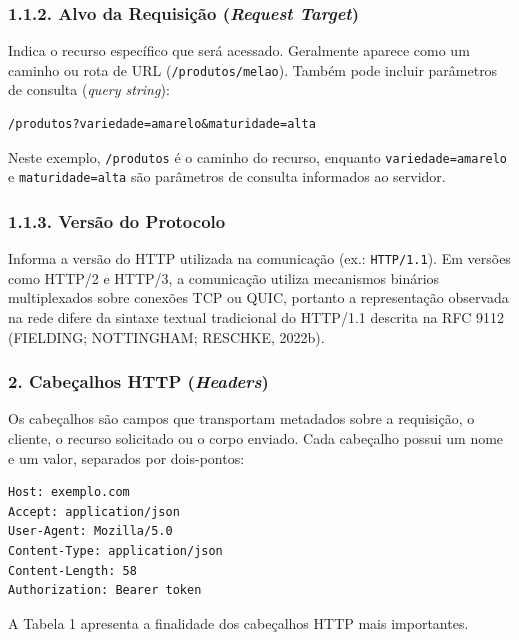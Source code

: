 \subsubsection*{1.1.2. Alvo da Requisição (\textit{Request Target})}

Indica o recurso específico que será acessado. Geralmente aparece como um caminho ou rota de URL (\texttt{/produtos/melao}). Também pode incluir parâmetros de consulta (\textit{query string}):

\begin{lstlisting}
/produtos?variedade=amarelo&maturidade=alta
\end{lstlisting}

Neste exemplo, \texttt{/produtos} é o caminho do recurso, enquanto \texttt{variedade=amarelo} e \texttt{maturidade=alta} são parâmetros de consulta informados ao servidor.

\subsubsection*{1.1.3. Versão do Protocolo}

Informa a versão do HTTP utilizada na comunicação (ex.: \texttt{HTTP/1.1}). Em versões como HTTP/2 e HTTP/3, a comunicação utiliza mecanismos binários multiplexados sobre conexões TCP ou QUIC, portanto a representação observada na rede difere da sintaxe textual tradicional do HTTP/1.1 descrita na RFC 9112 (FIELDING; NOTTINGHAM; RESCHKE, 2022b).

\subsubsection*{2. Cabeçalhos HTTP (\textit{Headers})}

Os cabeçalhos são campos que transportam metadados sobre a requisição, o cliente, o recurso solicitado ou o corpo enviado. Cada cabeçalho possui um nome e um valor, separados por dois-pontos:

\begin{lstlisting}
Host: exemplo.com
Accept: application/json
User-Agent: Mozilla/5.0
Content-Type: application/json
Content-Length: 58
Authorization: Bearer token
\end{lstlisting}

A Tabela 1 apresenta a finalidade dos cabeçalhos HTTP mais importantes.


